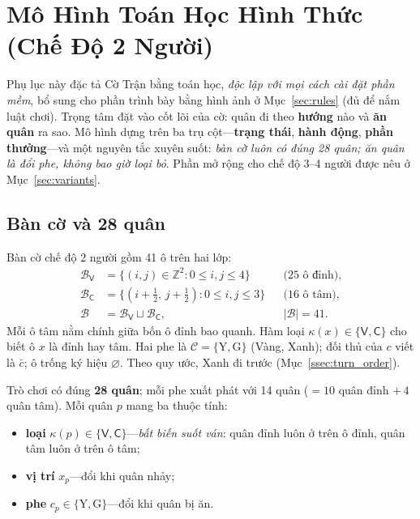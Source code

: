 \section{Mô Hình Toán Học Hình Thức (Chế Độ 2 Người)}
\label{app:formal}

Phụ lục này đặc tả Cờ Trận bằng toán học, \emph{độc lập với mọi
cách cài đặt phần mềm}, bổ sung cho phần trình bày bằng hình ảnh ở
Mục~\ref{sec:rules} (đủ để nắm luật chơi). Trọng tâm đặt
vào cốt lõi của cờ: quân đi theo \textbf{hướng} nào và \textbf{ăn quân}
ra sao. Mô hình dựng trên ba trụ cột---\textbf{trạng thái}, \textbf{hành
động}, \textbf{phần thưởng}---và một nguyên tắc xuyên suốt: \emph{bàn cờ
luôn có đúng 28 quân; ăn quân là đổi phe, không bao giờ loại bỏ}. Phần
mở rộng cho chế độ 3--4 người được nêu ở Mục~\ref{sec:variants}.

\subsection{Bàn cờ và 28 quân}
\label{ssec:board}

Bàn cờ chế độ 2 người gồm 41 ô trên hai lớp:
\begin{align}
\mathcal{B}_{\mathsf V}
  &= \{(i,j)\in\mathbb Z^2 : 0\le i,j\le 4\}
  && \text{(25 ô đỉnh)}, \label{eq:vert}\\
\mathcal{B}_{\mathsf C}
  &= \{(i{+}\tfrac12,\,j{+}\tfrac12) : 0\le i,j\le 3\}
  && \text{(16 ô tâm)}, \label{eq:cent}\\
\mathcal{B}
  &= \mathcal{B}_{\mathsf V}\sqcup\mathcal{B}_{\mathsf C},
  && |\mathcal{B}|=41. \label{eq:board}
\end{align}
Mỗi ô tâm nằm chính giữa bốn ô đỉnh bao quanh. Hàm loại
$\kappa(x)\in\{\mathsf V,\mathsf C\}$ cho biết ô $x$ là đỉnh hay tâm.
Hai phe là $\mathcal C=\{\mathrm Y,\mathrm G\}$ (Vàng, Xanh); đối thủ của
$c$ viết là $\bar c$; ô trống ký hiệu $\varnothing$. Theo quy ước, Xanh đi
trước (Mục~\ref{ssec:turn_order}).

Trò chơi có đúng \textbf{28 quân}; mỗi phe xuất phát với 14 quân
($=10$ quân đỉnh $+\,4$ quân tâm). Mỗi quân $p$ mang ba thuộc tính:
\begin{itemize}[noitemsep,topsep=2pt]
  \item \textbf{loại} $\kappa(p)\in\{\mathsf V,\mathsf C\}$---\emph{bất
        biến suốt ván}: quân đỉnh luôn ở trên ô đỉnh, quân tâm luôn ở
        trên ô tâm;
  \item \textbf{vị trí} $x_p$---đổi khi quân nhảy;
  \item \textbf{phe} $c_p\in\{\mathrm Y,\mathrm G\}$---đổi khi quân bị ăn.
\end{itemize}


